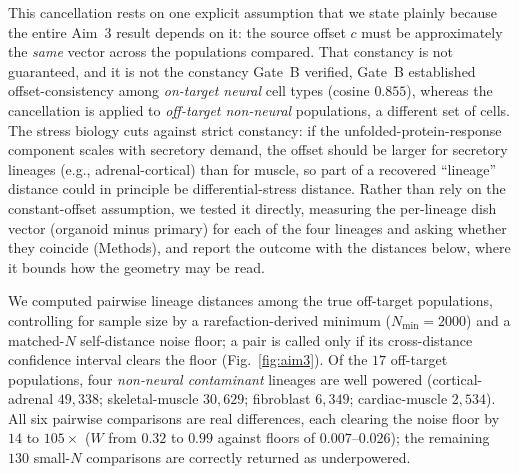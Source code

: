 \documentclass[11pt]{article}
\begin{document}
This cancellation rests on one explicit assumption that we state plainly because the entire Aim~3 result
depends on it: the source offset $c$ must be approximately the \emph{same} vector across the populations
compared. That constancy is not guaranteed, and it is not the constancy Gate~B verified, Gate~B
established offset-consistency among \emph{on-target neural} cell types (cosine $0.855$), whereas the
cancellation is applied to \emph{off-target non-neural} populations, a different set of cells. The stress
biology cuts against strict constancy: if the unfolded-protein-response component scales with secretory
demand, the offset should be larger for secretory lineages (e.g., adrenal-cortical) than for muscle, so
part of a recovered ``lineage'' distance could in principle be differential-stress distance. Rather than
rely on the constant-offset assumption, we tested it directly, measuring the per-lineage dish vector
(organoid minus primary) for each of the four lineages and asking whether they coincide (Methods), and
report the outcome with the distances below, where it bounds how the geometry may be read.

We computed pairwise lineage distances among the true off-target populations, controlling for sample
size by a rarefaction-derived minimum ($N_{\min}=2000$) and a matched-$N$ self-distance noise floor; a
pair is called only if its cross-distance confidence interval clears the floor (Fig.~\ref{fig:aim3}).
Of the $17$ off-target populations, four \emph{non-neural contaminant} lineages are well powered
(cortical-adrenal $49{,}338$; skeletal-muscle $30{,}629$; fibroblast $6{,}349$; cardiac-muscle
$2{,}534$). All six pairwise
comparisons are real differences, each clearing the noise floor by $14$ to $105\times$
($W$ from $0.32$ to $0.99$ against floors of $0.007$--$0.026$); the remaining $130$ small-$N$
comparisons are correctly returned as underpowered.
\end{document}
